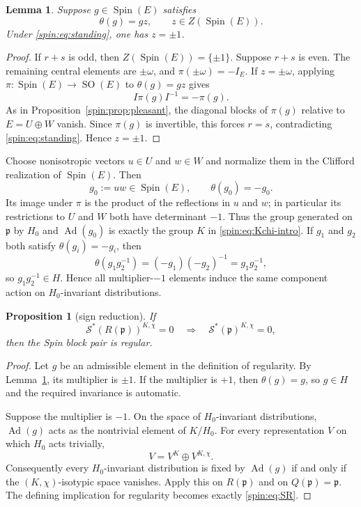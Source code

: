 \documentclass[11pt,reqno]{amsart}
\numberwithin{equation}{section}
\newtheorem{proposition}[theorem]{Proposition}
\newtheorem{lemma}[theorem]{Lemma}
\theoremstyle{definition}
\theoremstyle{remark}
\newcommand{\Spin}{\operatorname{Spin}}
\newcommand{\SO}{\operatorname{SO}}
\newcommand{\Ad}{\operatorname{Ad}}
\newcommand{\fp}{\mathfrak p}
\newcommand{\cS}{\mathcal S}
\begin{document}
\begin{lemma}\label{spin:lem:central-multipliers}
Suppose $g\in\Spin(E)$ satisfies
\[
  \theta(g)=gz,
  \qquad
  z\in Z(\Spin(E)).
\]
Under \eqref{spin:eq:standing}, one has $z=\pm1$.
\end{lemma}

\begin{proof}
If $r+s$ is odd, then $Z(\Spin(E))=\{\pm1\}$.  Suppose $r+s$ is even.
The remaining central elements are $\pm\omega$, and
$\pi(\pm\omega)=-I_E$.  If $z=\pm\omega$, applying
$\pi:\Spin(E)\to\SO(E)$ to $\theta(g)=gz$ gives
\[
  I\pi(g)I^{-1}=-\pi(g).
\]
As in Proposition~\ref{spin:prop:pleasant}, the diagonal blocks of $\pi(g)$
relative to $E=U\oplus W$ vanish.  Since $\pi(g)$ is invertible, this
forces $r=s$, contradicting \eqref{spin:eq:standing}.  Hence $z=\pm1$.
\end{proof}

Choose nonisotropic vectors $u\in U$ and $w\in W$ and normalize them in the
Clifford realization of $\Spin(E)$.  Then
\begin{equation}\label{spin:eq:g0-minus}
  g_0:=uw\in\Spin(E),
  \qquad
  \theta(g_0)=-g_0.
\end{equation}
Its image under $\pi$ is the product of the reflections in $u$ and $w$; in
particular its restrictions to $U$ and $W$ both have determinant $-1$.  Thus
the group generated on $\fp$ by $H_0$ and $\Ad(g_0)$ is exactly the group
$K$ in \eqref{spin:eq:Kchi-intro}.  If $g_1$ and $g_2$ both satisfy
$\theta(g_i)=-g_i$, then
\[
  \theta(g_1g_2^{-1})=(-g_1)(-g_2)^{-1}=g_1g_2^{-1},
\]
so $g_1g_2^{-1}\in H$.  Hence all multiplier-$-1$ elements induce the same
component action on $H_0$-invariant distributions.

\begin{proposition}[sign reduction]\label{spin:prop:sign-reduction}
If
\begin{equation}\label{spin:eq:SR}
  \cS^*(R(\fp))^{K,\chi}=0
  \quad\Longrightarrow\quad
  \cS^*(\fp)^{K,\chi}=0,
\end{equation}
then the Spin block pair is regular.
\end{proposition}

\begin{proof}
Let $g$ be an admissible element in the definition of regularity.  By
Lemma~\ref{spin:lem:central-multipliers}, its multiplier is $\pm1$.  If the
multiplier is $+1$, then $\theta(g)=g$, so $g\in H$ and the required
invariance is automatic.

Suppose the multiplier is $-1$.  On the space of $H_0$-invariant
distributions, $\Ad(g)$ acts as the nontrivial element of $K/H_0$.  For every
representation $V$ on which $H_0$ acts trivially,
\[
  V=V^K\oplus V^{K,\chi}.
\]
Consequently every $H_0$-invariant distribution is fixed by $\Ad(g)$ if and
only if the $(K,\chi)$-isotypic space vanishes.  Apply this on $R(\fp)$ and on
$Q(\fp)=\fp$.  The defining implication for regularity becomes exactly
\eqref{spin:eq:SR}.
\end{proof}
\end{document}
